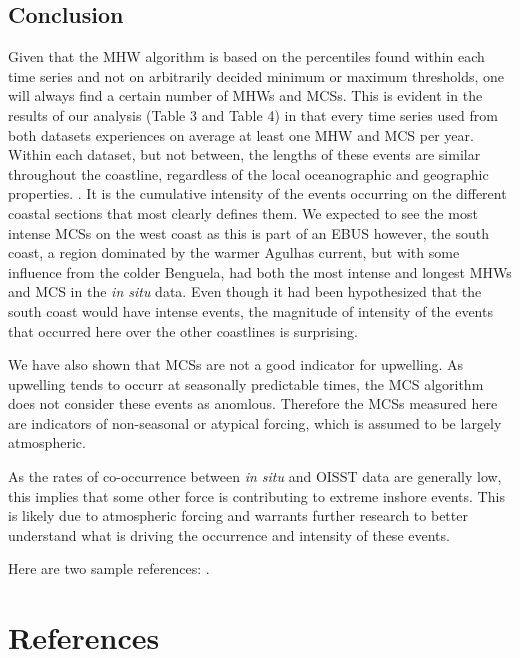\documentclass[a4paper,10pt,review]{elsarticle}
\begin{document}
\subsection{Conclusion}
Given that the MHW algorithm is based on the percentiles found within each time series and not on arbitrarily decided minimum or maximum thresholds, one will always find a certain number of MHWs and MCSs. This is evident in the results of our analysis (Table 3 and Table 4) in that every time series used from both datasets experiences on average at least one MHW and MCS per year. Within each dataset, but not between, the lengths of these events are similar throughout the coastline, regardless of the local oceanographic and geographic properties. . It is the cumulative intensity of the events occurring on the different coastal sections that most clearly defines them. We expected to see the most intense MCSs on the west coast as this is part of an EBUS however, the south coast, a region dominated by the warmer Agulhas current, but with some influence from the colder Benguela, had both the most intense and longest MHWs and MCS in the \emph{in situ} data. Even though it had been hypothesized that the south coast would have intense events, the magnitude of intensity of the events that occurred here over the other coastlines is surprising. 

We have also shown that MCSs are not a good indicator for upwelling. As upwelling tends to occurr at seasonally predictable times, the MCS algorithm does not consider these events as anomlous. Therefore the MCSs measured here are indicators of non-seasonal or atypical forcing, which is assumed to be largely atmospheric.

As the rates of co-occurrence between \emph{in situ} and OISST data are generally low, this implies that some other force is contributing to extreme inshore events. This is likely due to atmospheric forcing and warrants further research to better understand what is driving the occurrence and intensity of these events.

Here are two sample references: \cite{Feynman1963118,Dirac1953888}.

\section*{References}


\end{document}
